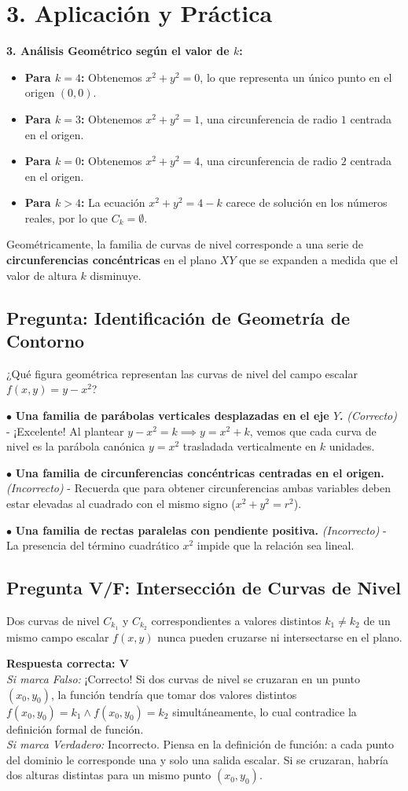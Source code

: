 \documentclass[11pt]{article}
\newenvironment{aplicacion}{%
  \section*{3. Aplicación y Práctica}%
}{}
\newenvironment{ejemplo}[1]{%
  \begin{tcolorbox}[colback=white,colframe=gray!40,title=Ejemplo: #1]%
}{%
  \end{tcolorbox}%
}
\newenvironment{preguntaalternativas}[1]{\subsection*{Pregunta: #1}\par\vspace{0.1cm}}{\vspace{0.3cm}}
\newcommand{\opcion}[3]{\par\noindent $\bullet$ \textbf{#1} \textit{(#2)} - #3\par\vspace{0.15cm}}
\newenvironment{preguntaverdaderofalso}[1]{\subsection*{Pregunta V/F: #1}\par\vspace{0.1cm}}{\vspace{0.3cm}}
\newcommand{\verdaderofalso}[3]{\par\noindent\textbf{Respuesta correcta: #1} \\ \textit{Si marca Falso:} #2 \\ \textit{Si marca Verdadero:} #3\par\vspace{0.15cm}}
\begin{document}
\begin{aplicacion}
\begin{ejemplo}{Construcción de Curvas de Nivel para un Paraboloide}
    \textbf{3. Análisis Geométrico según el valor de $k$:}
    \begin{itemize}
      \item \textbf{Para $k = 4$:} Obtenemos $x^2 + y^2 = 0$, lo que representa un único punto en el origen $(0,0)$.
      \item \textbf{Para $k = 3$:} Obtenemos $x^2 + y^2 = 1$, una circunferencia de radio $1$ centrada en el origen.
      \item \textbf{Para $k = 0$:} Obtenemos $x^2 + y^2 = 4$, una circunferencia de radio $2$ centrada en el origen.
      \item \textbf{Para $k > 4$:} La ecuación $x^2 + y^2 = 4 - k$ carece de solución en los números reales, por lo que $C_k = \emptyset$.
    \end{itemize}
    Geométricamente, la familia de curvas de nivel corresponde a una serie de \textbf{circunferencias concéntricas} en el plano $XY$ que se expanden a medida que el valor de altura $k$ disminuye.
  \end{ejemplo}

  \begin{preguntaalternativas}{Identificación de Geometría de Contorno}
    ¿Qué figura geométrica representan las curvas de nivel del campo escalar $f(x,y) = y - x^2$?
    
    \opcion{Una familia de parábolas verticales desplazadas en el eje $Y$.}{Correcto}{¡Excelente! Al plantear $y - x^2 = k \implies y = x^2 + k$, vemos que cada curva de nivel es la parábola canónica $y = x^2$ trasladada verticalmente en $k$ unidades.}
    \opcion{Una familia de circunferencias concéntricas centradas en el origen.}{Incorrecto}{Recuerda que para obtener circunferencias ambas variables deben estar elevadas al cuadrado con el mismo signo ($x^2 + y^2 = r^2$).}
    \opcion{Una familia de rectas paralelas con pendiente positiva.}{Incorrecto}{La presencia del término cuadrático $x^2$ impide que la relación sea lineal.}
  \end{preguntaalternativas}

  \begin{preguntaverdaderofalso}{Intersección de Curvas de Nivel}
    Dos curvas de nivel $C_{k_1}$ y $C_{k_2}$ correspondientes a valores distintos $k_1 \neq k_2$ de un mismo campo escalar $f(x,y)$ nunca pueden cruzarse ni intersectarse en el plano.
    
    \verdaderofalso{V}
      {¡Correcto! Si dos curvas de nivel se cruzaran en un punto $(x_0, y_0)$, la función tendría que tomar dos valores distintos $f(x_0, y_0) = k_1 \wedge f(x_0, y_0) = k_2$ simultáneamente, lo cual contradice la definición formal de función.}
      {Incorrecto. Piensa en la definición de función: a cada punto del dominio le corresponde una y solo una salida escalar. Si se cruzaran, habría dos alturas distintas para un mismo punto $(x_0,y_0)$.}
  \end{preguntaverdaderofalso}


\end{aplicacion}
\end{document}
